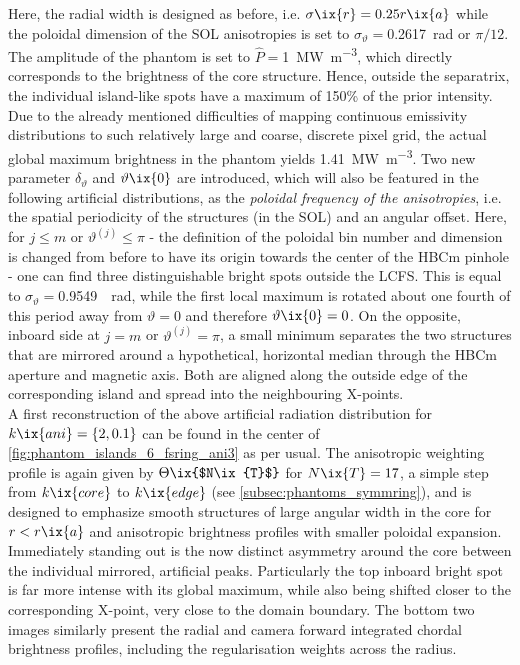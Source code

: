 %
            Here, the radial width is designed as before, i.e. $\sigma\ix{r}=0.25r\ix{a}$ while the poloidal dimension of the SOL anisotropies is set to $\sigma_{\vartheta}=$\SI{0.2617}{\radian} or $\pi/12$. The amplitude of the phantom is set to $\hat{P}=$\SI{1}{\mega\watt\per\cubic\meter}, which directly corresponds to the brightness of the core structure. Hence, outside the separatrix, the individual island-like spots have a maximum of 150\% of the prior intensity. Due to the already mentioned difficulties of mapping continuous emissivity distributions to such relatively large and coarse, discrete pixel grid, the actual global maximum brightness in the phantom yields \SI{1.41}{\mega\watt\per\cubic\meter}. Two new parameter $\delta_{\vartheta}$ and $\vartheta\ix{0}$ are introduced, which will also be featured in the following artificial distributions, as the \textit{poloidal frequency of the anisotropies}, i.e. the spatial periodicity of the structures (in the SOL) and an angular offset. Here, for $j\leq m$ or $\vartheta^{\left(j\right)}\leq\pi$ - the definition of the poloidal bin number and dimension is changed from before to have its origin towards the center of the HBCm pinhole - one can find three distinguishable bright spots outside the LCFS. This is equal to $\sigma_{\vartheta}=$\SI[per-mode=reciprocal]{0.9549}{\per\radian}, while the first local maximum is rotated about one fourth of this period away from $\vartheta=0$ and therefore $\vartheta\ix{0}=0$. On the opposite, inboard side at $j=m$ or $\vartheta^{\left(j\right)}=\pi$, a small minimum separates the two structures that are mirrored around a hypothetical, horizontal median through the HBCm aperture and magnetic axis. Both are aligned along the outside edge of the corresponding island and spread into the neighbouring X-points.\\%
            A first reconstruction of the above artificial radiation distribution for $k\ix{ani}=\left\{2,0.1\right\}$ can be found in the center of \cref{fig:phantom_islands_6_fsring_ani3} as per usual. The anisotropic weighting profile is again given by $\Theta\ix{$N\ix{T}$}$ for $N\ix{T}=17$, a simple step from $k\ix{core}$ to $k\ix{edge}$ (see \cref{subsec:phantoms_symmring}), and is designed to emphasize smooth structures of large angular width in the core for $r<r\ix{a}$ and anisotropic brightness profiles with smaller poloidal expansion. Immediately standing out is the now distinct asymmetry around the core between the individual mirrored, artificial peaks. Particularly the top inboard bright spot is far more intense with its global maximum, while also being shifted closer to the corresponding X-point, very close to the domain boundary. The bottom two images similarly present the radial and camera forward integrated chordal brightness profiles, including the regularisation weights across the radius.\\%
